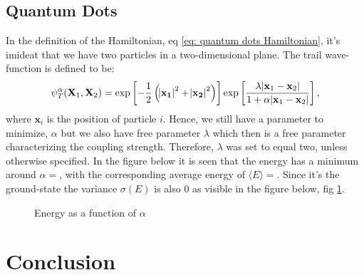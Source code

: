 \documentclass[a4paper]{article}
\newcommand{\w}{\omega}
\newcommand{\average}[1]{\langle #1 \rangle}
\begin{document}
\subsection{Quantum Dots}
In the definition of the Hamiltonian, eq \eqref{eq: quantum dots Hamiltonian}, it's imideat that we have two particles in a two-dimensional plane.
The trail wave-function is defined to be:
\begin{align*}
    \psi_T^{\alpha}(\mathbf{X}_1, \mathbf{X}_2) = \exp\left[-\frac{1}{2}\left(\abs{\mathbf{x_1}}^2 + \abs{\mathbf{x_2}}^2\right)\right]\exp\left[\frac{\lambda\abs{\mathbf{x}_1 - \mathbf{x}_2}}{1 + \alpha\abs{\mathbf{x}_1 - \mathbf{x}_2}}\right],
\end{align*}where $\mathbf{x}_i$ is the position of particle $i$.
Hence, we still have a parameter to minimize, $\alpha$ but we also have free parameter $\lambda$ which then is a free parameter characterizing the coupling strength.
Therefore, $\lambda$ was set to equal two, unless otherwise specified.
In the figure below it is seen that the energy has a minimum around $\alpha = $, with the corresponding average energy of $\average{E} = $.
Since it's the ground-state the variance $\sigma(E)$ is also $0$ as visible in the figure below, fig \ref{fig: quantum dots: lambda 2}.
\begin{figure}[H]
    \centering
    \caption{Energy as a function of $\alpha$}
    \label{fig: quantum dots: lambda 2}
\end{figure}

\section{Conclusion}

\end{document}
